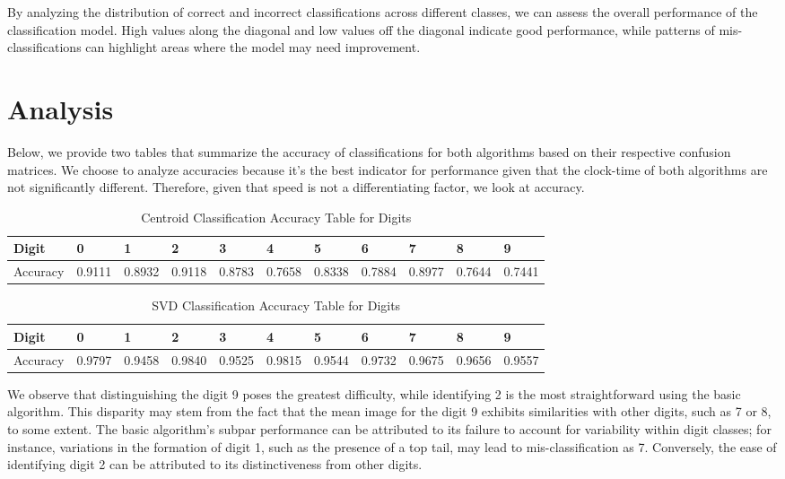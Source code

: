 \documentclass{article} %
\begin{document}
            \noindent By analyzing the distribution of correct and incorrect classifications across different classes, we can assess the overall performance of the classification model. High values along the diagonal and low values off the diagonal indicate good performance, while patterns of mis-classifications can highlight areas where the model may need improvement.
            
  \section{Analysis}
  Below, we provide two tables that summarize the accuracy of classifications for both algorithms based on their respective confusion matrices. We choose to analyze accuracies because it's the best indicator for performance given that the clock-time of both algorithms are not significantly different. Therefore, given that speed is not a differentiating factor, we look at accuracy.

  \begin{center}
    \begin{table}[h]
        \caption{Centroid Classification Accuracy Table for Digits}
        \begin{tabular}{|l|l|l|l|l|l|l|l|l|l|l|}
        \hline
        Digit    & 0      & 1      & 2      & 3      & 4      & 5      & 6      & 7      & 8      & 9      \\
        \hline
        Accuracy & 0.9111 & 0.8932 & 0.9118 & 0.8783 & 0.7658 & 0.8338 & 0.7884 & 0.8977 & 0.7644 & 0.7441 \\
        \hline
        \end{tabular}
    \end{table}
    \begin{table}[h]
        \caption{SVD Classification Accuracy Table for Digits}
        \begin{tabular}{|l|l|l|l|l|l|l|l|l|l|l|}
        \hline
        Digit    & 0      & 1      & 2      & 3      & 4      & 5      & 6      & 7      & 8      & 9      \\
        \hline
        Accuracy & 0.9797 & 0.9458 & 0.9840 & 0.9525 & 0.9815 & 0.9544 & 0.9732 & 0.9675 & 0.9656 & 0.9557 \\
        \hline
        \end{tabular}
    \end{table}
  \end{center}
  We observe that distinguishing the digit 9 poses the greatest difficulty, while identifying 2 is the most straightforward using the basic algorithm. This disparity may stem from the fact that the mean image for the digit 9 exhibits similarities with other digits, such as 7 or 8, to some extent. The basic algorithm's subpar performance can be attributed to its failure to account for variability within digit classes; for instance, variations in the formation of digit 1, such as the presence of a top tail, may lead to mis-classification as 7. Conversely, the ease of identifying digit 2 can be attributed to its distinctiveness from other digits. \\
\end{document}
